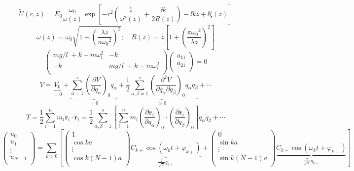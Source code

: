 \documentclass { article }
\begin{document}
\[\tilde{U}(r,z)=E_0\dfrac{\omega_0}{\omega(z)}\exp\left[-r^2\left(\dfrac{1}{\omega^2(z)}+\dfrac{\ii k}{2R(z)}\right)-\ii k z+\ii \zeta(z)\right]\]
\[\omega(z)=\omega_0\sqrt{1+\left(\dfrac{\lambda z}{\pi {\omega_0}^2}\right)^2};\quad R(z)=z\left[1+\left(\dfrac{\pi {\omega_0}^2}{\lambda z}\right)^2\right]\]
\[\left( \begin{matrix}
{mg}/{l}\;+k-m\omega _{1}^{2} & -k  \\
-k & {mg}/{l}\;+k-m\omega _{1}^{2}  \\
\end{matrix} \right)\left( \begin{matrix}
{{a}_{11}}  \\
{{a}_{21}}  \\
\end{matrix} \right)=0\]
\[V=\underbrace{{{V}_{0}}}_{=0}+\underbrace{\sum\limits_{\alpha =1}^{s}{{{\left( \frac{\partial V}{\partial {{q}_{\alpha }}} \right)}_{0}}{{q}_{\alpha }}}}_{=0}+\underbrace{\frac{1}{2}\sum\limits_{\alpha ,\beta =1}^{s}{{{\left( \frac{{{\partial }^{2}}V}{\partial {{q}_{\alpha }}\partial {{q}_{\beta }}} \right)}_{0}}{{q}_{\alpha }}{{q}_{\beta }}}}_{>0}+\cdots \]
\[T=\frac{1}{2}\sum\limits_{i=1}^{n}{{{m}_{i}}{{{\dot{\bm r}}}_{i}}\cdot {{{\dot{\bm r}}}_{i}}}=\frac{1}{2}\sum\limits_{\alpha ,\beta =1}^{s}{\left[ \sum\limits_{i=1}^{n}{{{m}_{i}}{{\left( \frac{\partial {{\bm r}_{i}}}{\partial {{q}_{\alpha }}} \right)}_{0}}\cdot {{\left( \frac{\partial {{\bm r}_{i}}}{\partial {{q}_{\beta }}} \right)}_{0}}} \right]{{{\dot{q}}}_{\alpha }}{{{\dot{q}}}_{\beta }}}+\cdots \]
\[\left( \begin{matrix}
{{u}_{0}}  \\
{{u}_{1}}  \\
\vdots   \\
{{u}_{N-1}}  \\
\end{matrix} \right)=\sum\limits_{k>0}{\left[ \left( \begin{matrix}
	1  \\
	\cos ka  \\
	\vdots   \\
	\cos k\left( N-1 \right)a  \\
	\end{matrix} \right)\underbrace{{{C}_{k+}}\cos \left( {{\omega }_{k}}t+{{\varphi }_{k+}} \right)}_{\frac{2}{\sqrt{N}}{{q}_{k+}}}+\left( \begin{matrix}
	0  \\
	\sin ka  \\
	\vdots   \\
	\sin k\left( N-1 \right)a  \\
	\end{matrix} \right)\underbrace{{{C}_{k-}}\cos \left( {{\omega }_{k}}t+{{\varphi }_{k-}} \right)}_{\frac{2}{\sqrt{N}}{{q}_{k-}}} \right]}\]
\end{document}
